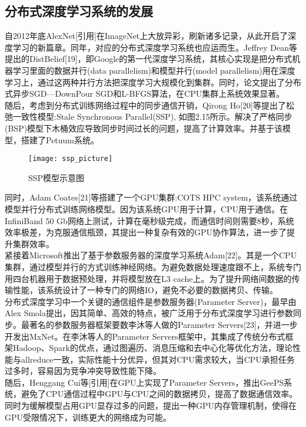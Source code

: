 \subsection{分布式深度学习系统的发展}
自2012年底AlexNet[引用]在ImageNet上大放异彩，刷新诸多记录，从此开启了深度学习的新篇章。同年，对应的分布式深度学习系统也应运而生。Jeffrey Dean等提出的DistBelief[19]，即Google的第一代深度学习系统，其核心实现是把分布式机器学习里面的数据并行(data parallelism)和模型并行(model parallelism)用在深度学习上，通过这两种并行方法把深度学习大规模化到集群。同时，论文提出了分布式异步SGD—DownPour SGD和L-BFGS算法，在CPU集群上系统效果显著。\\
随后，考虑到分布式训练网络过程中的同步通信开销，Qirong Ho[20]等提出了松弛一致性模型:Stale Synchronous Parallel(SSP), 如图2.15所示。解决了严格同步(BSP)模型下木桶效应导致同步时间过长的问题，提高了计算效率。并基于该模型，搭建了Petuum系统。\\
\begin{figure}[htp]
\centering
\texttt{[image: ssp\_picture]}
\caption{SSP模型示意图}
\end{figure}
同时，Adam Coates[21]等搭建了一个GPU集群:COTS HPC system，该系统通过模型并行分布式训练网络模型。因为该系统GPU用于计算，CPU用于通信。在InfiniBand 50 Gb网络上测试，计算在毫秒级完成，而通信时间则需要8秒，系统效率极差，为克服通信瓶颈，其提出一种复杂有效的GPU协作算法，进一步了提升集群效率。\\
紧接着Microsoft推出了基于参数服务器的深度学习系统Adam[22]。其是一个CPU集群，通过模型并行的方式训练神经网络。为避免数据处理速度跟不上，系统专门用四台机器用于数据预处理，并将模型放在L3 cache上。为了提升网络间数据的传输性能，该系统设计了一种专门的网络IO，避免不必要的数据拷贝、传输。\\
分布式深度学习中一个关键的通信组件是参数服务器(Parameter Server)，最早由Alex Smola提出，因其简单、高效的特点，被广泛用于分布式深度学习进行参数同步。最著名的参数服务器框架要数李沐等人做的Parameter Servers[23]，并进一步开发出MxNet。在李沐等人的Parameter Servers框架中，其集成了传统分布式框架Hadoop、Spark的优点，通过图遍历、消息压缩和去中心化等优化方法，理论性能与allreduce一致，实际性能十分优异，但其对CPU需求较大，当CPU承担任务过多时，容易因为竞争冲突导致性能下降。\\
随后，Henggang Cui等[引用]在GPU上实现了Parameter Servers，推出GeePS系统，避免了CPU通信过程中GPU与CPU之间的数据拷贝，提高了数据通信效率。同时为缓解模型占用GPU显存过多的问题，提出一种GPU内存管理机制，使得在GPU受限情况下，训练更大的网络成为可能。
